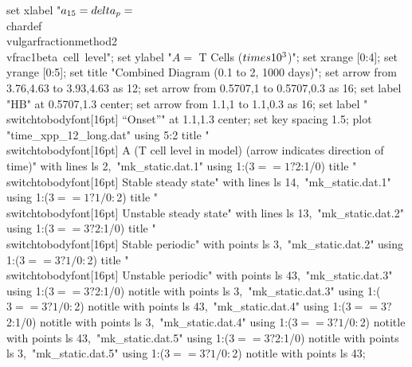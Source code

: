   set xlabel "$a_{15} = \\delta_p = $\\chardef\\vulgarfractionmethod2\\vfrac1{beta~cell~level}";
  set ylabel "$A = $ T Cells ($\\times 10^3$)";
  set xrange [0:4];
  set yrange [0:5];
  set title "Combined Diagram (0.1 to 2, 1000 days)";
  set arrow from 3.76,4.63 to 3.93,4.63 as 12;
  set arrow from 0.5707,1 to 0.5707,0.3 as 16;
  set label "HB" at 0.5707,1.3 center;
  set arrow from 1.1,1 to 1.1,0.3 as 16;
  set label "\\switchtobodyfont[16pt] “Onset”" at 1.1,1.3 center;
  set key spacing 1.5;
  plot "time_xpp_12_long.dat" using 5:2 title "\\switchtobodyfont[16pt] A (T cell level in model)  (arrow indicates direction of time)" with lines ls 2,\
       "mk_static.dat.1" using 1:($3==1?$2:1/0) title "\\switchtobodyfont[16pt] Stable steady state" with lines ls 14,\
       "mk_static.dat.1" using 1:($3==1?1/0:$2) title "\\switchtobodyfont[16pt] Unstable steady state" with lines ls 13,\
       "mk_static.dat.2" using 1:($3==3?$2:1/0) title "\\switchtobodyfont[16pt] Stable periodic" with points ls 3,\
       "mk_static.dat.2" using 1:($3==3?1/0:$2) title "\\switchtobodyfont[16pt] Unstable periodic" with points ls 43,\
       "mk_static.dat.3" using 1:($3==3?$2:1/0) notitle with points ls 3,\
       "mk_static.dat.3" using 1:($3==3?1/0:$2) notitle with points ls 43,\
       "mk_static.dat.4" using 1:($3==3?$2:1/0) notitle with points ls 3,\
       "mk_static.dat.4" using 1:($3==3?1/0:$2) notitle with points ls 43,\
       "mk_static.dat.5" using 1:($3==3?$2:1/0) notitle with points ls 3,\
       "mk_static.dat.5" using 1:($3==3?1/0:$2) notitle with points ls 43;
\stopGNUPLOTscript

